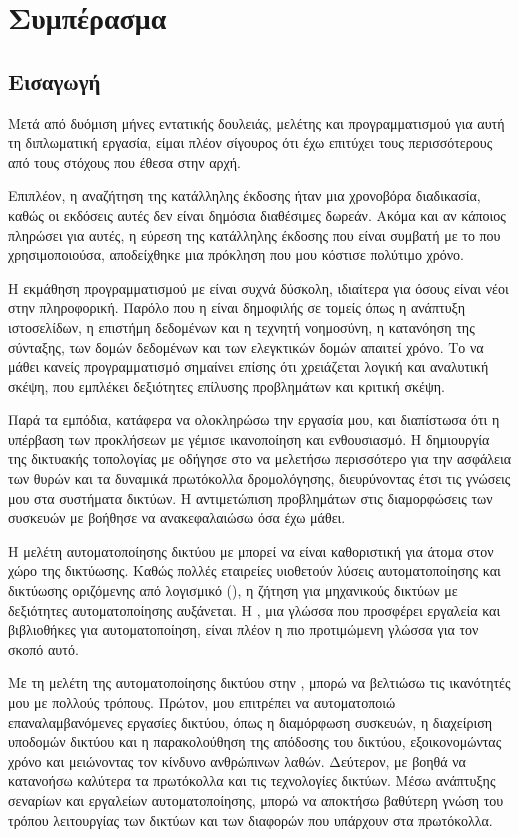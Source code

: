 
\chapter{Συμπέρασμα}

\section{Εισαγωγή}

Μετά από δυόμιση μήνες εντατικής δουλειάς, μελέτης και 
προγραμματισμού για αυτή τη διπλωματική εργασία, είμαι πλέον 
σίγουρος ότι έχω επιτύχει τους περισσότερους από τους στόχους που 
έθεσα στην αρχή.

Επιπλέον, η αναζήτηση της κατάλληλης έκδοσης  ήταν μια χρονοβόρα διαδικασία, καθώς οι εκδόσεις αυτές δεν είναι δημόσια διαθέσιμες δωρεάν. 
Ακόμα και αν κάποιος πληρώσει για αυτές, η εύρεση της κατάλληλης έκδοσης  που είναι συμβατή με το  που χρησιμοποιούσα, αποδείχθηκε μια πρόκληση που μου 
κόστισε πολύτιμο χρόνο.

Η εκμάθηση προγραμματισμού με  είναι συχνά δύσκολη, ιδιαίτερα για όσους είναι νέοι στην πληροφορική. Παρόλο που η  είναι 
δημοφιλής σε τομείς όπως η ανάπτυξη ιστοσελίδων, η επιστήμη δεδομένων και η τεχνητή νοημοσύνη, η κατανόηση της σύνταξης, των δομών δεδομένων και των 
ελεγκτικών δομών απαιτεί χρόνο. Το να μάθει κανείς προγραμματισμό σημαίνει επίσης ότι χρειάζεται λογική και αναλυτική σκέψη, που εμπλέκει δεξιότητες επίλυσης προβλημάτων 
και κριτική σκέψη.

Παρά τα εμπόδια, κατάφερα να ολοκληρώσω την εργασία μου, και διαπίστωσα ότι η υπέρβαση των προκλήσεων με γέμισε ικανοποίηση και ενθουσιασμό. 
Η δημιουργία της δικτυακής τοπολογίας με οδήγησε στο να μελετήσω περισσότερο για την ασφάλεια των θυρών και τα δυναμικά πρωτόκολλα δρομολόγησης, 
διευρύνοντας έτσι τις γνώσεις μου στα συστήματα δικτύων. Η αντιμετώπιση προβλημάτων στις διαμορφώσεις των συσκευών με βοήθησε να ανακεφαλαιώσω όσα έχω μάθει.

Η μελέτη αυτοματοποίησης δικτύου με  μπορεί να είναι καθοριστική για άτομα στον χώρο της δικτύωσης. 
Καθώς πολλές εταιρείες υιοθετούν λύσεις αυτοματοποίησης και δικτύωσης οριζόμενης από λογισμικό (), η ζήτηση για μηχανικούς δικτύων με δεξιότητες αυτοματοποίησης αυξάνεται. 
Η , μια γλώσσα που προσφέρει εργαλεία και βιβλιοθήκες για αυτοματοποίηση, είναι πλέον η πιο προτιμώμενη γλώσσα για τον σκοπό αυτό.

Με τη μελέτη της αυτοματοποίησης δικτύου στην , μπορώ να βελτιώσω τις ικανότητές μου με πολλούς τρόπους. 
Πρώτον, μου επιτρέπει να αυτοματοποιώ επαναλαμβανόμενες εργασίες δικτύου, όπως η διαμόρφωση συσκευών, η διαχείριση υποδομών δικτύου και η παρακολούθηση της απόδοσης του 
δικτύου, εξοικονομώντας χρόνο και μειώνοντας τον κίνδυνο ανθρώπινων λαθών. Δεύτερον, με βοηθά να κατανοήσω καλύτερα τα πρωτόκολλα και τις τεχνολογίες δικτύων. 
Μέσω ανάπτυξης σεναρίων και εργαλείων αυτοματοποίησης, μπορώ να αποκτήσω βαθύτερη γνώση του τρόπου λειτουργίας των δικτύων και των διαφορών που υπάρχουν στα πρωτόκολλα.

